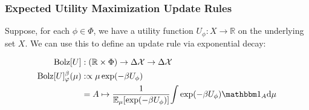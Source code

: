 \subsubsection{Expected Utility Maximization Update Rules}


%
%

\def\Bolz#1{\mathrm{Bolz}[#1]}


Suppose, for each $\phi \in \Phi$, we have a utility function $U_\phi : X \to \mathbb R$ on the underlying set $X$.
We can use this to define an update rule via exponential decay:

\begin{align*}
	\Bolz U &: (\mathbb R \times \Phi) \to \Delta\X \to \Delta\X \\
	\Bolz U^\beta_\varphi(\mu)
		&:\propto
			\mu \exp(-\beta U_\phi) \\
		&= A \mapsto \frac
			1{\Ex_{\mu} [ \exp(-\beta U_\phi)]}
			{\int \exp(-\beta U_\phi) \mathbbm 1_A \mathrm d\mu }
\end{align*}

